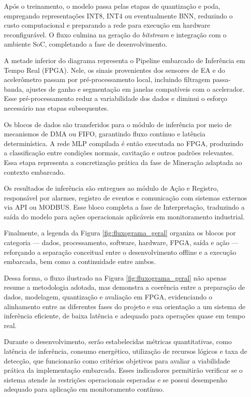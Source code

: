 Após o treinamento, o modelo passa pelas etapas de quantização e poda, empregando representações INT8, INT4 ou eventualmente BNN, reduzindo o custo computacional e preparando a rede para execução em hardware reconfigurável. O fluxo culmina na geração do \textit{bitstream} e integração com o ambiente SoC, completando a fase de desenvolvimento.

A metade inferior do diagrama representa o Pipeline embarcado de Inferência em Tempo Real (FPGA). Nele, os sinais provenientes dos sensores de EA e do acelerômetro passam por pré-processamento local, incluindo filtragem passa-banda, ajustes de ganho e segmentação em janelas compatíveis com o acelerador. Esse pré-processamento reduz a variabilidade dos dados e diminui o esforço necessário nas etapas subsequentes.

Os blocos de dados são transferidos para o módulo de inferência por meio de mecanismos de DMA ou FIFO, garantindo fluxo contínuo e latência determinística. A rede MLP compilada é então executada no FPGA, produzindo a classificação entre condições normais, cavitação e outros padrões relevantes. Essa etapa representa a concretização prática da fase de Mineração adaptada ao contexto embarcado.

Os resultados de inferência são entregues ao módulo de Ação e Registro, responsável por alarmes, registro de eventos e comunicação com sistemas externos via API ou MODBUS. Esse bloco completa a fase de Interpretação, traduzindo a saída do modelo para ações operacionais aplicáveis em monitoramento industrial.

Finalmente, a legenda da Figura \ref{fig:fluxograma_geral} organiza os blocos por categoria — dados, processamento, software, hardware, FPGA, saída e ação — reforçando a separação conceitual entre o desenvolvimento offline e a execução embarcada, bem como a continuidade entre ambos.

Dessa forma, o fluxo ilustrado na Figura \ref{fig:fluxograma_geral} não apenas resume a metodologia adotada, mas demonstra a coerência entre a preparação de dados, modelagem, quantização e avaliação em FPGA, evidenciando o alinhamento entre as diferentes fases do projeto e sua orientação a um sistema de inferência eficiente, de baixa latência e adequado para operações quase em tempo real.

Durante o desenvolvimento, serão estabelecidas métricas quantitativas, como latência de inferência, consumo energético, utilização de recursos lógicos e taxa de detecção, que funcionarão como critérios objetivos para avaliar a viabilidade prática da implementação embarcada. Esses indicadores permitirão verificar se o sistema atende às restrições operacionais esperadas e se possui desempenho adequado para aplicação em monitoramento contínuo.

